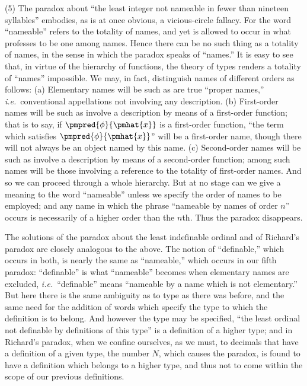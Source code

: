 \documentclass[letterpaper,12pt,openany,leqno]{book}
\newcommand{\pagefirst}[1]{\marginnote[\boxed{\text{#1}}]{\boxed{\text{#1}}}}
\begin{document}
(5) The paradox about ``the least integer not nameable in fewer than nineteen syllables'' embodies, as is at once obvious, a vicious-circle fallacy. For the word ``nameable'' refers to the totality of names, and yet is allowed to occur in what professes to be one among names. Hence there can be no such thing as a totality of names, in the sense in which the paradox speaks of ``names.'' It is easy to see that, in virtue of the hierarchy of functions, the theory of types renders a totality of ``names'' impossible. We may, in fact, distinguish names of different orders as follows: (a) Elementary names will be such as are true ``proper names,'' \textit{i.e.}\ conventional \pagefirst{67} appellations not involving any description. (b) First-order names will be such as involve a description by means of a first-order function; that is to say, if $\pmpred{\phi}{\pmhat{x}}$ is a first-order function, ``the term which satisfies $\pmpred{\phi}{\pmhat{x}}$'' will be a first-order name, though there will not always be an object named by this name. (c) Second-order names will be such as involve a description by means of a second-order function; among such names will be those involving a reference to the totality of first-order names. And so we can proceed through a whole hierarchy. But at no stage can we give a meaning to the word ``nameable'' unless we specify the order of names to be employed; and any name in which the phrase ``nameable by names of order $n$'' occurs is necessarily of a higher order than the $n$th. Thus the paradox disappears. 

The solutions of the paradox about the least indefinable ordinal and of Richard's paradox are closely analogous to the above. The notion of ``definable,'' which occurs in both, is nearly the same as ``nameable,'' which occurs in our fifth paradox: ``definable'' is what ``nameable'' becomes when elementary names are excluded, \textit{i.e.}\ ``definable'' means ``nameable by a name which is not elementary.'' But here there is the same ambiguity as to type as there was before, and the same need for the addition of words which specify the type to which the definition is to belong. And however the type may be specified, ``the least ordinal not definable by definitions of this type'' is a definition of a higher type; and in Richard's paradox, when we confine ourselves, as we must, to decimals that have a definition of a given type, the number $N$, which causes the paradox, is found to have a definition which belongs to a higher type, and thus not to come within the scope of our previous definitions.
\end{document}
